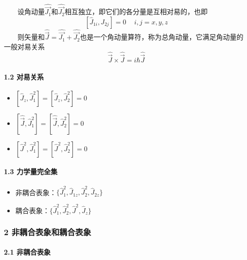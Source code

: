 \documentclass[UTF8,twocolumn]{ctexart}
\providecommand{\tightlist}{%
  \setlength{\itemsep}{0pt}\setlength{\parskip}{0pt}}
\let\oldparagraph\paragraph
\renewcommand{\paragraph}[1]{\oldparagraph{#1}\mbox{}}
\begin{document}
  设角动量\(\hat{\vec{J_1}}\)和\(\hat{\vec{J_2}}\)相互独立，即它们的各分量是互相对易的，也即
\[[\hat{J}_{1i},\hat{J}_{2j}]=0\,\,\,\,\,\,\,i,j=x,y,z\]
  则矢量和\(\hat{\vec{J}}=\hat{\vec{J_1}}+\hat{\vec{J_2}}\)也是一个角动量算符，称为总角动量，它满足角动量的一般对易关系
\[\hat{\vec{J}}\times\hat{\vec{J}}=i\hbar\hat{\vec{J}}\]

\hypertarget{ux5bf9ux6613ux5173ux7cfb-2}{%
\paragraph{ 1.2 对易关系}\label{ux5bf9ux6613ux5173ux7cfb-2}}

\begin{itemize}
\tightlist
\item
  \([\hat{J}_z,\hat{J}_1^2]=[\hat{J}_z,\hat{J}_2^2]=0\)
\item
  \([\hat{\vec{J}},\hat{J}_1^2]=[\hat{\vec{J}},\hat{J}_2^2]=0\)
\item
  \([\hat{J}^2,\hat{J}_1^2]=[\hat{J}^2,\hat{J}_2^2]=0\)
\end{itemize}

\hypertarget{ux529bux5b66ux91cfux5b8cux5168ux96c6}{%
\paragraph{ 1.3
力学量完全集}\label{ux529bux5b66ux91cfux5b8cux5168ux96c6}}

\begin{itemize}
\tightlist
\item
  非耦合表象：\(\{\hat{J}_1^2,\hat{J}_{1z},\hat{J}_2^2,\hat{J}_{2z}\}\)
\item
  耦合表象：\(\{\hat{J}_1^2,\hat{J}_2^2,\hat{J}^2,\hat{J}_z\}\)
\end{itemize}

\hypertarget{ux975eux8026ux5408ux8868ux8c61ux548cux8026ux5408ux8868ux8c61}{%
\subsubsection{2
非耦合表象和耦合表象}\label{ux975eux8026ux5408ux8868ux8c61ux548cux8026ux5408ux8868ux8c61}}

\hypertarget{ux975eux8026ux5408ux8868ux8c61}{%
\paragraph{ 2.1 非耦合表象}\label{ux975eux8026ux5408ux8868ux8c61}}
\end{document}
